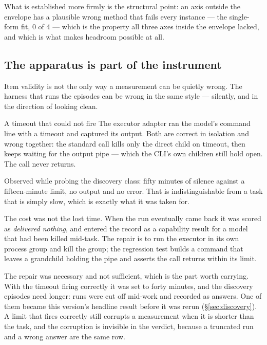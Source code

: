 \documentclass[11pt]{article}
\theoremstyle{definition}
\begin{document}
What is established more firmly is the structural point: an axis outside the envelope has a plausible wrong method that fails every instance --- the single-form fit, 0 of 4 --- which is the property all three axes inside the envelope lacked, and which is what makes headroom possible at all.

\subsection{The apparatus is part of the instrument}\label{sec:apparatus}

Item validity is not the only way a measurement can be quietly wrong. The harness that runs the episodes can be wrong in the same style --- silently, and in the direction of looking clean.

\begin{cautionbox}{A timeout that could not fire}
The executor adapter ran the model's command line with a timeout and captured its output. Both are correct in isolation and wrong together: the standard call kills only the direct child on timeout, then keeps waiting for the output pipe --- which the CLI's own children still hold open. The call never returns.

Observed while probing the discovery class: fifty minutes of silence against a fifteen-minute limit, no output and no error. That is indistinguishable from a task that is simply slow, which is exactly what it was taken for.

The cost was not the lost time. When the run eventually came back it was scored as \emph{delivered nothing}, and entered the record as a capability result for a model that had been killed mid-task. The repair is to run the executor in its own process group and kill the group; the regression test builds a command that leaves a grandchild holding the pipe and asserts the call returns within its limit.
\end{cautionbox}

The repair was necessary and not sufficient, which is the part worth carrying. With the timeout firing correctly it was set to forty minutes, and the discovery episodes need longer: runs were cut off mid-work and recorded as answers. One of them became this version's headline result before it was rerun (\S\ref{sec:discovery}). A limit that fires correctly still corrupts a measurement when it is shorter than the task, and the corruption is invisible in the verdict, because a truncated run and a wrong answer are the same row.
\end{document}

